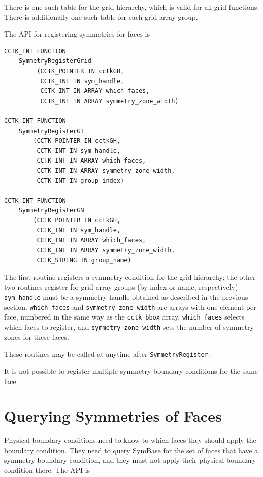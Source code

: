 There is one such table for the grid hierarchy, which is valid for all
grid functions.  There is additionally one such table for each grid
array group.

The API for registering symmetries for faces is

\begin{verbatim}
CCTK_INT FUNCTION
    SymmetryRegisterGrid
         (CCTK_POINTER IN cctkGH,
          CCTK_INT IN sym_handle,
          CCTK_INT IN ARRAY which_faces,
          CCTK_INT IN ARRAY symmetry_zone_width)

CCTK_INT FUNCTION
    SymmetryRegisterGI
        (CCTK_POINTER IN cctkGH,
         CCTK_INT IN sym_handle,
         CCTK_INT IN ARRAY which_faces,
         CCTK_INT IN ARRAY symmetry_zone_width,
         CCTK_INT IN group_index)

CCTK_INT FUNCTION
    SymmetryRegisterGN
        (CCTK_POINTER IN cctkGH,
         CCTK_INT IN sym_handle,
         CCTK_INT IN ARRAY which_faces,
         CCTK_INT IN ARRAY symmetry_zone_width,
         CCTK_STRING IN group_name)
\end{verbatim}

The first routine registers a symmetry condition for the grid hierarchy;
the other two routines register for grid array groups (by index or 
name, respectively)
\texttt{sym\_handle} must be a symmetry handle obtained as
described in the previous section.  \texttt{which\_faces} and
\texttt{symmetry\_zone\_width} are arrays with one element per face,
numbered in the same way as the \texttt{cctk\_bbox} array.
\texttt{which\_faces} selects which faces to register, and
\texttt{symmetry\_zone\_width} sets the number of symmetry zones for
these faces.

These routines may be called at anytime after \texttt{SymmetryRegister}.

It is not possible to register multiple symmetry boundary conditions
for the same face.



\section{Querying Symmetries of Faces}

Physical boundary conditions need to know to which faces they should
apply the boundary condition.  They need to query SymBase for the set
of faces that have a symmetry boundary condition, and they must not
apply their physical boundary condition there.  The API is

